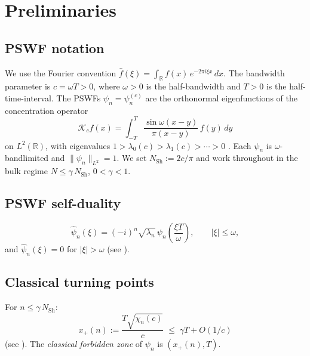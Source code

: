 \documentclass[12pt,a4paper]{article}
\theoremstyle{definition}
\newcommand{\NSh}{N_{\mathrm{Sh}}}
\begin{document}
\section{Preliminaries}
\label{sec:prelim}

\subsection{PSWF notation}

We use the Fourier convention
$\widehat{f}(\xi)
= \int_{\mathbb{R}} f(x)\,e^{-2\pi i\xi x}\,dx$.
The bandwidth parameter is $c = \omega T > 0$,
where $\omega > 0$ is the half-bandwidth and $T > 0$
is the half-time-interval.
The PSWFs $\psi_n = \psi_n^{(c)}$ are the orthonormal
eigenfunctions of the concentration operator
\[
  \mathcal{K}_c f(x)
  = \int_{-T}^T
    \frac{\sin\omega(x-y)}{\pi(x-y)}\,f(y)\,dy
\]
on $L^2(\mathbb{R})$, with eigenvalues
$1 > \lambda_0(c) > \lambda_1(c) > \cdots > 0$
\cite{Slepian64,OsipovRokhlinXiao}.
Each $\psi_n$ is $\omega$-bandlimited and
$\|\psi_n\|_{L^2} = 1$.
We set $\NSh := 2c/\pi$ and work throughout in the
bulk regime $N \le \gamma\,\NSh$, $0 < \gamma < 1$.

\subsection{PSWF self-duality}
\label{subsec:selfduality}

\begin{equation}
\label{eq:selfduality}
  \widehat{\psi}_n(\xi)
  = (-i)^n\sqrt{\lambda_n}\,
    \psi_n\!\left(\frac{\xi T}{\omega}\right),
  \qquad |\xi| \le \omega,
\end{equation}
and $\widehat\psi_n(\xi) = 0$ for $|\xi| > \omega$
(see \cite[eq.~(2.37)]{OsipovRokhlinXiao}).

\subsection{Classical turning points}

For $n \le \gamma\,\NSh$:
\begin{equation}
\label{eq:turning}
  x_+(n)
  := \frac{T\sqrt{\chi_n(c)}}{c}
  \;\le\; \gamma T + O(1/c)
\end{equation}
(see \cite[Theorem~2.7]{OsipovRokhlinXiao}).
The \emph{classical forbidden zone} of $\psi_n$ is
$(x_+(n), T)$.
\end{document}

